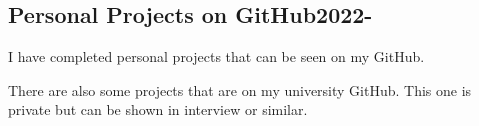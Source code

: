 \documentclass[a4paper, 12pt]{article}
\begin{document}
\subsection {{Personal Projects on GitHub}\hfill 2022-}
\begin{zitemize}
\item I have completed personal projects that can be seen on my GitHub.
\item There are also some projects that are on my university GitHub. This one is private but can be shown in interview or similar.
\end{zitemize}
\end{document}
